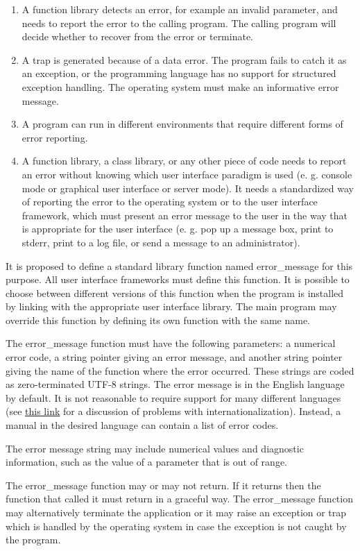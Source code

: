 \documentclass[forwardcom.tex]{subfiles}
\begin{document}
\begin{enumerate}
\item A function library detects an error, for example an invalid parameter, and needs to report the error to the calling program. The calling program will decide whether to recover from the error or terminate. 

\item A trap is generated because of a data error. The program fails to catch it as an exception, or the programming language has no support for structured exception handling. The operating system must make an informative error message. 

\item A program can run in different environments that require different forms of error reporting. 

\item A function library, a class library, or any other piece of code needs to report an error without knowing which user interface paradigm is used (e. g. console mode or graphical user interface or server mode). It needs a standardized way of reporting the error to the operating system or to the user interface framework, which must present an error 
message to the user in the way that is appropriate for the user interface (e. g. pop up a message box, print to stderr, print to a log file, or send a message to an administrator).
\end{enumerate}

\label{errorReportFunction}
It is proposed to define a standard library function named error\_message for this purpose. All user interface frameworks must define this function. It is possible to choose between different versions of this function when the program is installed by linking with the appropriate user interface library. The main program may override this function by defining its own function with the same name. 
\vv

The error\_message function must have the following parameters: a numerical error code, a string pointer giving an error message, and another string pointer giving the name of the function where the error occurred. These strings are coded as zero-terminated UTF-8 strings. 
The error message is in the English language by default. It is not reasonable to require support for many different languages (see 
\href{https://en.wikibooks.org/wiki/Usability_for_Nerds/Software/Internationalization}{this link} for a discussion of problems with internationalization). Instead, a manual in the desired language can contain a list of error codes. 
\vv

The error message string may include numerical values and diagnostic information, such as the value of a parameter that is out of range.
\vv

The error\_message function may or may not return. If it returns then the function that called it must return in a graceful way. The error\_message function may alternatively terminate the application or it may raise an exception or trap which is handled by the operating system in case the exception is not caught by the program. 
\vv

 
\end{document}
